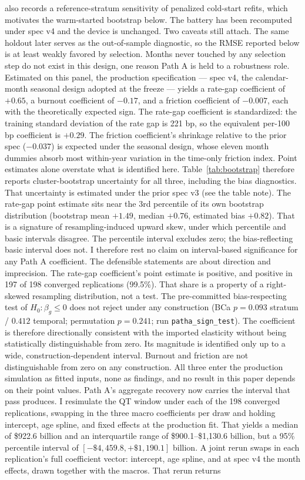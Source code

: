 \documentclass[12pt]{article}
\begin{document}
also records a reference-stratum sensitivity of penalized cold-start refits, which motivates the warm-started bootstrap below. The battery has been recomputed under spec v4 and the device is unchanged. Two caveats still attach. The same holdout later serves as the out-of-sample diagnostic, so the RMSE reported below is at least weakly favored by selection. Months never touched by any selection step do not exist in this design, one reason Path A is held to a robustness role.
Estimated on this panel, the production specification --- spec v4, the calendar-month seasonal design adopted at the freeze --- yields a rate-gap coefficient of $+0.65$, a burnout coefficient of $-0.17$, and a friction coefficient of $-0.007$, each with the theoretically expected sign. The rate-gap coefficient is standardized: the training standard deviation of the rate gap is 221 bp, so the equivalent per-100 bp coefficient is $+0.29$. The friction coefficient's shrinkage relative to the prior spec ($-0.037$) is expected under the seasonal design, whose eleven month dummies absorb most within-year variation in the time-only friction index. Point estimates alone overstate what is identified here. Table~\ref{tab:bootstrap} therefore reports cluster-bootstrap uncertainty for all three, including the bias diagnostics. That uncertainty is estimated under the prior spec v3 (see the table note). The rate-gap point estimate sits near the 3rd percentile of its own bootstrap distribution (bootstrap mean $+1.49$, median $+0.76$, estimated bias $+0.82$). That is a signature of resampling-induced upward skew, under which percentile and basic intervals disagree. The percentile interval excludes zero; the bias-reflecting basic interval does not. I therefore rest no claim on interval-based significance for any Path A coefficient. The defensible statements are about direction and imprecision. The rate-gap coefficient's point estimate is positive, and positive in 197 of 198 converged replications (99.5\%). That share is a property of a right-skewed resampling distribution, not a test. The pre-committed bias-respecting test of $H_0\!: \beta_g \le 0$ does not reject under any construction (BCa $p = 0.093$ stratum / $0.412$ temporal; permutation $p = 0.241$; run \texttt{patha\_sign\_test}). The coefficient is therefore directionally consistent with the imported elasticity without being statistically distinguishable from zero. Its magnitude is identified only up to a wide, construction-dependent interval. Burnout and friction are not distinguishable from zero on any construction. All three enter the production simulation as fitted inputs, none as findings, and no result in this paper depends on their point values. Path A's aggregate recovery now carries the interval that pass produces. I resimulate the QT window under each of the 198 converged replications, swapping in the three macro coefficients per draw and holding intercept, age spline, and fixed effects at the production fit. That yields a median of \$922.6 billion and an interquartile range of \$900.1--\$1{,}130.6 billion, but a 95\% percentile interval of $[-\$4{,}459.8, +\$1{,}190.1]$ billion. A joint rerun swaps in each replication's full coefficient vector: intercept, age spline, and at spec v4 the month effects, drawn together with the macros. That rerun returns 
\end{document}
